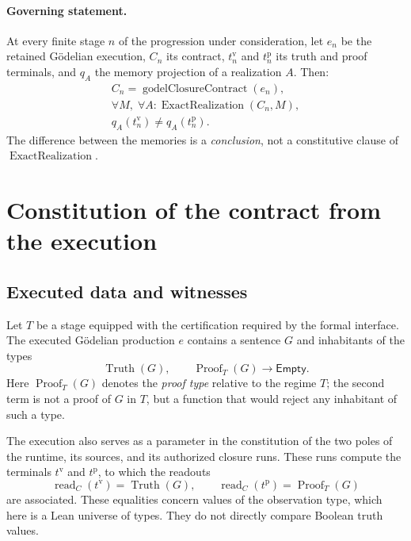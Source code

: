 \documentclass[11pt,a4paper]{article}
\newcommand{\Truth}{\operatorname{Truth}}
\newcommand{\Proof}{\operatorname{Proof}}
\newcommand{\ExactRealization}{\operatorname{ExactRealization}}
\newcommand{\Empty}{\mathsf{Empty}}
\theoremstyle{remark}
\begin{document}
\paragraph{Governing statement.}
At every finite stage $n$ of the progression under consideration, let
$e_n$ be the retained Gödelian execution, $C_n$ its contract,
$t_n^{\mathrm v}$ and $t_n^{\mathrm p}$ its truth and proof terminals, and
$q_A$ the memory projection of a realization $A$. Then:
\begin{equation}\label{eq:main}
\boxed{\begin{gathered}
C_n=\operatorname{godelClosureContract}(e_n),\\[3pt]
\forall M,\;\forall A:\ExactRealization(C_n,M),\\[2pt]
q_A(t_n^{\mathrm v})\neq q_A(t_n^{\mathrm p}).
\end{gathered}}
\end{equation}
The difference between the memories is a \emph{conclusion}, not a
constitutive clause of $\ExactRealization$.

\section{Constitution of the contract from the execution}
\label{sec:contract}

\subsection{Executed data and witnesses}

Let $T$ be a stage equipped with the certification required by the formal
interface. The executed Gödelian production $e$ contains a sentence $G$
and inhabitants of the types
\begin{equation}\label{eq:witnesses}
\Truth(G),\qquad \Proof_T(G)\longrightarrow\Empty.
\end{equation}
Here $\Proof_T(G)$ denotes the \emph{proof type} relative to the regime
$T$; the second term is not a proof of $G$ in $T$, but a function that
would reject any inhabitant of such a type.

The execution also serves as a parameter in the constitution of the two
poles of the runtime, its sources, and its authorized closure runs. These
runs compute the terminals $t^{\mathrm v}$ and $t^{\mathrm p}$, to which
the readouts
\begin{equation}\label{eq:readouts}
\operatorname{read}_C(t^{\mathrm v})=\Truth(G),\qquad
\operatorname{read}_C(t^{\mathrm p})=\Proof_T(G)
\end{equation}
are associated. These equalities concern values of the observation type,
which here is a Lean universe of types. They do not directly compare
Boolean truth values.
\end{document}
